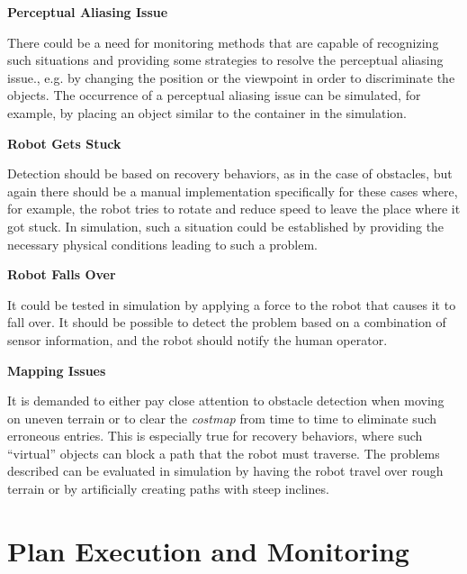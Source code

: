 \documentclass[english, master, utf8]{base/thesis_KBS}
\newcommand{\code}{\collectverb{\codebox}}
\begin{document}
\noindent
\textbf{Perceptual Aliasing Issue}\newline

\noindent
There could be a need for monitoring methods that are capable of recognizing such situations and providing some strategies to resolve the 
perceptual aliasing issue., e.g. by changing the position or the viewpoint in order to discriminate the objects.
The occurrence of a perceptual aliasing issue can be simulated, for example, by placing an object similar to the container in the simulation.\newline

\noindent
\textbf{Robot Gets Stuck}\newline

\noindent
Detection should be based on \code{move_base_flex} recovery behaviors, as in the case of obstacles, but again there should be a manual implementation 
specifically for these cases where, for example, the robot tries to rotate and reduce speed to leave the place where it got stuck.
In simulation, such a situation could be established by providing the necessary physical conditions leading to such a problem.\newline

\noindent
\textbf{Robot Falls Over}\newline

\noindent
It could be tested in simulation by applying a force to the robot that causes it to fall over.
It should be possible to detect the problem based on a combination of sensor information, and the robot should notify the human operator.\newline

\noindent
\textbf{Mapping Issues}\newline

\noindent
It is demanded to either pay close attention to obstacle detection when moving on uneven terrain or to clear the \textit{costmap} from time to time
to eliminate such erroneous entries. This is especially true for recovery behaviors,  where such ``virtual'' objects can block a path that the robot must traverse.
The problems described can be evaluated in simulation by having the robot travel over rough terrain or by artificially creating paths with steep inclines.

\chapter{Plan Execution and Monitoring}
\label{sec:plan_execution_and_monitoring}
\end{document}
